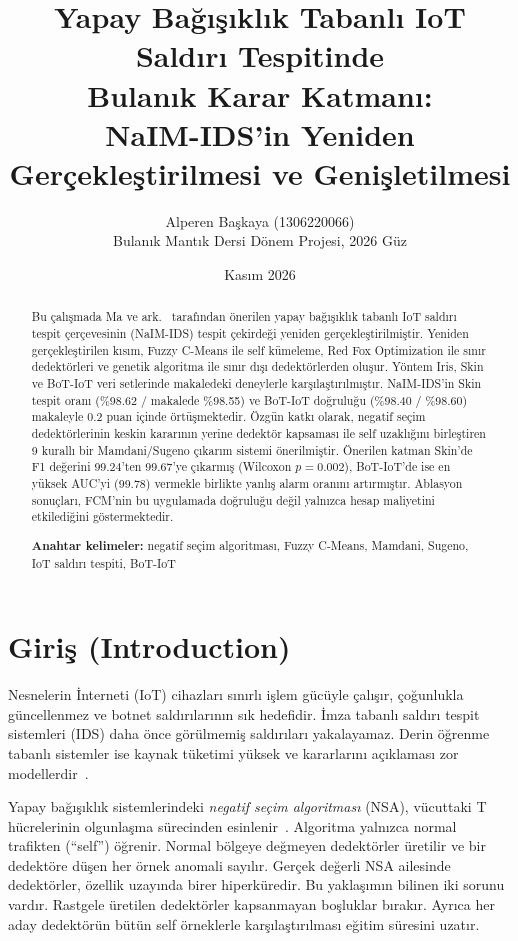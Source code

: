 \documentclass[11pt,a4paper]{article}
\title{\textbf{Yapay Bağışıklık Tabanlı IoT Saldırı Tespitinde\\ Bulanık Karar Katmanı:\\ NaIM-IDS'in Yeniden Gerçekleştirilmesi ve Genişletilmesi}}
\author{Alperen Başkaya \quad (1306220066)\\ \small Bulanık Mantık Dersi Dönem Projesi, 2026 Güz}
\date{Kasım 2026}
\begin{document}
\maketitle

\begin{abstract}
\noindent Bu çalışmada Ma ve ark.~\cite{ma2024} tarafından önerilen yapay bağışıklık tabanlı IoT saldırı tespit çerçevesinin (NaIM-IDS) tespit çekirdeği yeniden gerçekleştirilmiştir. Yeniden gerçekleştirilen kısım, Fuzzy C-Means ile self kümeleme, Red Fox Optimization ile sınır dedektörleri ve genetik algoritma ile sınır dışı dedektörlerden oluşur. Yöntem Iris, Skin ve BoT-IoT veri setlerinde makaledeki deneylerle karşılaştırılmıştır. NaIM-IDS'in Skin tespit oranı (\%98.62 / makalede \%98.55) ve BoT-IoT doğruluğu (\%98.40 / \%98.60) makaleyle 0.2 puan içinde örtüşmektedir. Özgün katkı olarak, negatif seçim dedektörlerinin keskin kararının yerine dedektör kapsaması ile self uzaklığını birleştiren 9 kurallı bir Mamdani/Sugeno çıkarım sistemi önerilmiştir. Önerilen katman Skin'de F1 değerini 99.24'ten 99.67'ye çıkarmış (Wilcoxon $p = 0.002$), BoT-IoT'de ise en yüksek AUC'yi (99.78) vermekle birlikte yanlış alarm oranını artırmıştır. Ablasyon sonuçları, FCM'nin bu uygulamada doğruluğu değil yalnızca hesap maliyetini etkilediğini göstermektedir.

\smallskip\noindent\textbf{Anahtar kelimeler:} negatif seçim algoritması, Fuzzy C-Means, Mamdani, Sugeno, IoT saldırı tespiti, BoT-IoT
\end{abstract}

\section{Giriş (Introduction)}

Nesnelerin İnterneti (IoT) cihazları sınırlı işlem gücüyle çalışır, çoğunlukla güncellenmez ve botnet saldırılarının sık hedefidir. İmza tabanlı saldırı tespit sistemleri (IDS) daha önce görülmemiş saldırıları yakalayamaz. Derin öğrenme tabanlı sistemler ise kaynak tüketimi yüksek ve kararlarını açıklaması zor modellerdir~\cite{arp2022}.

Yapay bağışıklık sistemlerindeki \emph{negatif seçim algoritması} (NSA), vücuttaki T hücrelerinin olgunlaşma sürecinden esinlenir~\cite{forrest1994}. Algoritma yalnızca normal trafikten (``self'') öğrenir. Normal bölgeye değmeyen dedektörler üretilir ve bir dedektöre düşen her örnek anomali sayılır. Gerçek değerli NSA ailesinde~\cite{gonzalez2003,ji2004} dedektörler, özellik uzayında birer hiperküredir. Bu yaklaşımın bilinen iki sorunu vardır. Rastgele üretilen dedektörler kapsanmayan boşluklar bırakır. Ayrıca her aday dedektörün bütün self örneklerle karşılaştırılması eğitim süresini uzatır.
\end{document}

